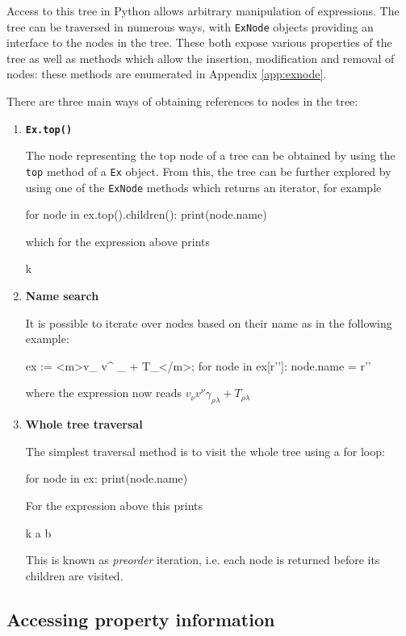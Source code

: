 \documentclass{article}
\begin{document}
Access to this tree in Python allows arbitrary manipulation of expressions. The tree can be traversed in
numerous ways, with \texttt{ExNode} objects providing an interface to the nodes in the tree. These both expose
various properties of the tree as well as methods which allow the insertion, modification and removal of nodes:
these methods are enumerated in Appendix \ref{app:exnode}. 

There are three main ways of obtaining references to nodes in the tree:
\begin{enumerate}[label=\textbf{\arabic*}.]
	\item \textbf{\texttt{Ex.top()}}
	
	The node representing the top node of a tree can be obtained by using the \texttt{top} method of a
	\texttt{Ex} object. From this, the tree can be further explored by using one of the \texttt{ExNode} methods
	which returns an iterator, for example
	\begin{lstcdb}
		for node in ex.top().children():
			print(node.name)
	\end{lstcdb}
	which for the expression above prints
	\begin{lstverb}
		k
		\sum
	\end{lstverb}

	\item \textbf{Name search}
	
	It is possible to iterate over nodes based on their name as in the following example:
	\begin{lstcdb}
		ex := <m>v_{\mu} v^{\mu} \gamma_{\rho \lambda} + T_{\rho \lambda}</m>;
		for node in ex[r'\mu']:
			node.name = r'\nu'
	\end{lstcdb}
	where the expression now reads $v_{\nu} v^{\nu} \gamma_{\rho \lambda} + T_{\rho \lambda}$
	\item \textbf{Whole tree traversal}
	
	The simplest traversal method is to visit the whole tree using a for loop:
	\begin{lstcdb}
		for node in ex:
			print(node.name)
	\end{lstcdb}
	For the expression above this prints
	\begin{lstverb}
		\prod
		k
		\sum
		a
		\mu
		b
		\mu
	\end{lstverb}
	This is known as \emph{preorder} iteration, i.e. each node is returned before its children are visited.	
\end{enumerate}


\subsection{Accessing property information}
\end{document}
